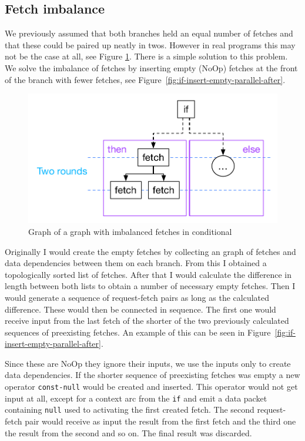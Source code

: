 \subsection{Fetch imbalance}

We previously assumed that both branches held an equal number of fetches and that these could be paired up neatly in twos.
However in real programs this may not be the case at all, see Figure \ref{fig:if-insert-empty-parallel-before}.
There is a simple solution to this problem.
We solve the imbalance of fetches by inserting empty (NoOp) fetches at the front of the branch with fewer fetches, see Figure~\ref{fig:if-insert-empty-parallel-after}.

\begin{figure}
    \includegraphics[width=\linewidth]{../Figures/if-insert-empty-parallel-before}
    \caption{Graph of a graph with imbalanced fetches in conditional}
    \label{fig:if-insert-empty-parallel-before}
\end{figure}

Originally I would create the empty fetches by collecting an graph of fetches and data dependencies between them on each branch.
From this I obtained a topologically sorted list of fetches.
After that I would calculate the difference in length between both lists to obtain a number of necessary empty fetches.
Then I would generate a sequence of request-fetch pairs as long as the calculated difference.
These would then be connected in sequence.
The first one would receive input from the last fetch of the shorter of the two previously calculated sequences of preexisting fetches.
An example of this can be seen in Figure~\ref{fig:if-insert-empty-parallel-after}.

Since these are NoOp they ignore their inputs, we use the inputs only to create data dependencies.
If the shorter sequence of preexisting fetches was empty a new operator \texttt{const-null} would be created and inserted.
This operator would not get input at all, except for a context arc from the \texttt{if} and emit a data packet containing \texttt{null} used to activating the first created fetch.
The second request-fetch pair would receive as input the result from the first fetch and the third one the result from the second and so on.
The final result was discarded.

